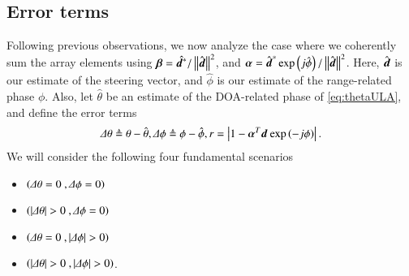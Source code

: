 \subsection*{Error terms}
Following previous observations, we now analyze the case where we coherently sum the array elements using $\boldsymbol{\beta}=\hat{\boldsymbol{d}^\ast}/\left\Vert\hat{\boldsymbol{d}}\right\Vert^2$, and 
$\boldsymbol{\alpha}=\hat{\boldsymbol{d}}^\ast\exp\left({j\hat{\phi}}\right)/\left\Vert\hat{\boldsymbol{d}}\right\Vert^2$. Here,  $\hat{\boldsymbol{d}}$ is our estimate of the steering vector, and $\hat{\phi}$ is our estimate of the range-related phase $\phi$. Also, let $\hat\theta$ be an estimate of the DOA-related phase of \eqref{eq:thetaULA}, and define the error terms
\[
\Delta\theta\triangleq {\theta-\hat{\theta}}, \Delta\phi\triangleq {\phi-\hat{\phi}}, 
r=\left\vert1-\boldsymbol{\alpha}^{T}\boldsymbol{d}_{}\exp{\left({-j\phi}\right)}\right\vert.
\]
We will consider the following four fundamental scenarios
\begin{itemize}
    \item{ $\left({\Delta\theta=0\ , \Delta\phi=0}\right)$}
    \item{ $\left({\left\vert\Delta\theta\right\vert>0\ , \Delta\phi=0}\right)$}
    \item{ $\left({\Delta\theta=0\ , \left\vert\Delta\phi\right\vert>0}\right)$}
    \item{ $\left({\left\vert\Delta\theta\right\vert>0\ , \left\vert\Delta\phi\right\vert>0}\right)$}.
\end{itemize}
\ifdefined\showTodo
